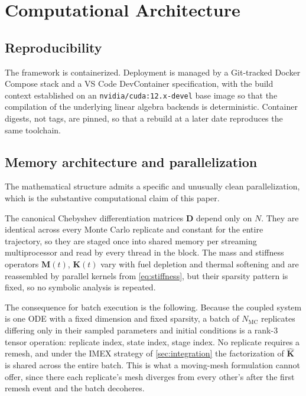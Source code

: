 \documentclass[11pt,a4paper]{article}
\theoremstyle{definition}
\numberwithin{equation}{section}
\begin{document}
\section{Computational Architecture}
\label{sec:architecture}

\subsection{Reproducibility}
\label{sec:repro}

The framework is containerized. Deployment is managed by a Git-tracked Docker Compose stack and a VS Code DevContainer specification, with the build context established on an \texttt{nvidia/cuda:12.x-devel} base image so that the compilation of the underlying linear algebra backends is deterministic. Container digests, not tags, are pinned, so that a rebuild at a later date reproduces the same toolchain.

\subsection{Memory architecture and parallelization}
\label{sec:cuda}

The mathematical structure admits a specific and unusually clean parallelization, which is the substantive computational claim of this paper.

The canonical Chebyshev differentiation matrices $\mathbf{D}$ depend only on $N$. They are identical across every Monte Carlo replicate and constant for the entire trajectory, so they are staged once into shared memory per streaming multiprocessor and read by every thread in the block. The mass and stiffness operators $\mathbf{M}(t)$, $\mathbf{K}(t)$ vary with fuel depletion and thermal softening and are reassembled by parallel kernels from \cref{eq:stiffness}, but their sparsity pattern is fixed, so no symbolic analysis is repeated.

The consequence for batch execution is the following. Because the coupled system is one ODE with a fixed dimension and fixed sparsity, a batch of $N_{\text{MC}}$ replicates differing only in their sampled parameters and initial conditions is a rank-3 tensor operation: replicate index, state index, stage index. No replicate requires a remesh, and under the IMEX strategy of \cref{sec:integration} the factorization of $\hat{\mathbf{K}}$ is shared across the entire batch. This is what a moving-mesh formulation cannot offer, since there each replicate's mesh diverges from every other's after the first remesh event and the batch decoheres.
\end{document}
